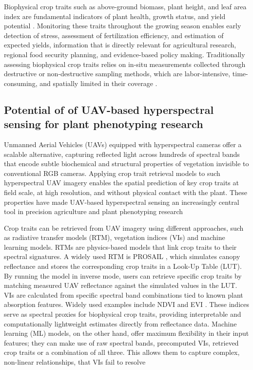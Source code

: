 \maketitle 

Biophysical crop traits such as above-ground biomass, plant height, and leaf area index are fundamental indicators of plant health, growth status, and yield potential \parencite{li_review_2026}. Monitoring these traits throughout the growing season enables early detection of stress, assessment of fertilization efficiency, and estimation of expected yields, information that is directly relevant for agricultural research, regional food security planning, and evidence-based policy making. Traditionally assessing biophysical crop traits relies on in-situ measurements collected through destructive or non-destructive sampling methods, which are labor-intensive, time-consuming, and spatially limited in their coverage \parencite{kumar_remote_2017}.


\subsection{Potential of of UAV-based hyperspectral sensing for plant phenotyping research}

Unmanned Aerial Vehicles (UAVs) equipped with hyperspectral cameras offer a scalable alternative, capturing reflected light across hundreds of spectral bands that encode subtle biochemical and structural properties of vegetation invisible to conventional RGB cameras. Applying crop trait retrieval models to such hyperspectral UAV imagery enables the spatial prediction of key crop traits at field scale, at high resolution, and without physical contact with the plant. These properties have made UAV-based hyperspectral sensing an increasingly central tool in precision agriculture and plant phenotyping research \parencite{li_review_2026}

Crop traits can be retrieved from UAV imagery using different approaches, such as radiative transfer models (RTM), vegetation indices (VIs) and machine learning models.
RTMs are physics-based models that link crop traits to their spectral signatures. A widely used RTM is PROSAIL \parencite{bhadra_prosail-net_2024,noauthor_eoa-teamprosail_forward_2026, gomez-dans_jgomezdansprosail_2026, jacquemoud_prospect_2009}, which simulates canopy reflectance and stores the corresponding crop traits in a Look-Up Table (LUT). By running the model in inverse mode, users can retrieve specific crop traits by matching measured UAV reflectance against the simulated values in the LUT. VIs are calculated from specific spectral band combinations tied to known plant absorption features. Widely used examples include NDVI and  EVI \parencite{radocaj_state_2023}. These indices serve as spectral proxies for biophysical crop traits, providing interpretable and computationally lightweight estimates directly from reflectance data. Machine learning (ML) models, on the other hand, offer maximum flexibility in their input features; they can make use of raw spectral bands, precomputed VIs, retrieved crop traits  or a combination of all three. This allows them to capture complex, non-linear relationships, that VIs fail to resolve 

